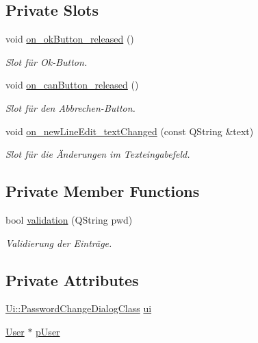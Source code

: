 \subsection*{Private Slots}
\begin{CompactItemize}
\item 
void \hyperlink{class_password_change_dialog_588135dfb30c966f44d8fe5a40b86fbe}{on\_\-okButton\_\-released} ()
\begin{CompactList}\small\item\em Slot für Ok-Button. \item\end{CompactList}\item 
void \hyperlink{class_password_change_dialog_b9ca3366f45f33030f996a7f48b167eb}{on\_\-canButton\_\-released} ()
\begin{CompactList}\small\item\em Slot für den Abbrechen-Button. \item\end{CompactList}\item 
void \hyperlink{class_password_change_dialog_73aab90dfad0af6bb73e7df28eb0932e}{on\_\-newLineEdit\_\-textChanged} (const QString \&text)
\begin{CompactList}\small\item\em Slot für die Änderungen im Texteingabefeld. \item\end{CompactList}\end{CompactItemize}
\subsection*{Private Member Functions}
\begin{CompactItemize}
\item 
bool \hyperlink{class_password_change_dialog_b59001d4e9b88ce141f588c510024e8f}{validation} (QString pwd)
\begin{CompactList}\small\item\em Validierung der Einträge. \item\end{CompactList}\end{CompactItemize}
\subsection*{Private Attributes}
\begin{CompactItemize}
\item 
\hyperlink{class_ui_1_1_password_change_dialog_class}{Ui::PasswordChangeDialogClass} \hyperlink{class_password_change_dialog_cde00bd2d83685f5973bcf304ca100e5}{ui}
\item 
\hyperlink{class_user}{User} $\ast$ \hyperlink{class_password_change_dialog_251ff69dbc17e4169c3457f701683c7b}{pUser}
\end{CompactItemize}


